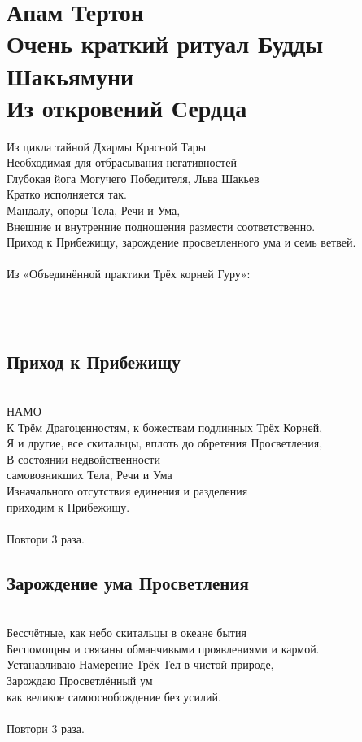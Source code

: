 \section{Апам Тертон\\Очень краткий ритуал Будды Шакьямуни\\Из откровений Сердца}
\scriptsize
Из цикла тайной Дхармы Красной Тары\\
Необходимая для отбрасывания негативностей \\
Глубокая йога Могучего Победителя, Льва Шакьев\\
Кратко исполняется так.\\
Мандалу, опоры Тела, Речи и Ума,\\
Внешние и внутренние подношения размести соответственно.\\
Приход к Прибежищу, зарождение просветленного ума и семь ветвей.\\
\\
\vspace{1cm}
Из «Объединённой практики Трёх корней Гуру»:

\\
\normalsize
\\
\subsection{Приход к Прибежищу}
\\

НАМО\\
К Трём Драгоценностям, к божествам подлинных Трёх Корней,\\
Я и другие, все скитальцы, вплоть до обретения Просветления,\\
В состоянии недвойственности \\ \indent самовозникших Тела, Речи и Ума\\
Изначального отсутствия единения и разделения \\ \indent приходим к Прибежищу.\\
\\
\indent Повтори 3 раза.

\subsection{Зарождение ума Просветления}
\\
Бессчётные, как небо скитальцы в океане бытия\\
Беспомощны и связаны обманчивыми проявлениями и кармой.\\
Устанавливаю Намерение Трёх Тел в чистой природе, \\
Зарождаю Просветлённый ум \\ \indent как великое самоосвобождение без усилий. \\
\\
\indent Повтори 3 раза.\\

